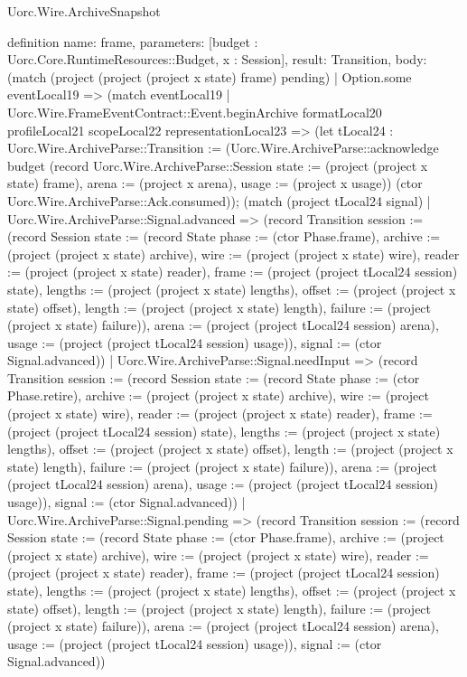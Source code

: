 \begin{lexlean}{Uorc.Wire.ArchiveSnapshot}
\begin{semanticmodule}
definition{
  name: frame,
  parameters: [budget : Uorc.Core.RuntimeResources::Budget, x : Session],
  result: Transition,
  body: (match (project (project (project x state) frame) pending)
    | Option.some eventLocal19 => (match eventLocal19
      | Uorc.Wire.FrameEventContract::Event.beginArchive formatLocal20 profileLocal21 scopeLocal22 representationLocal23 => (let tLocal24 : Uorc.Wire.ArchiveParse::Transition := (Uorc.Wire.ArchiveParse::acknowledge budget (record Uorc.Wire.ArchiveParse::Session {state := (project (project x state) frame), arena := (project x arena), usage := (project x usage)}) (ctor Uorc.Wire.ArchiveParse::Ack.consumed)); (match (project tLocal24 signal)
        | Uorc.Wire.ArchiveParse::Signal.advanced => (record Transition {session := (record Session {state := (record State {phase := (ctor Phase.frame), archive := (project (project x state) archive), wire := (project (project x state) wire), reader := (project (project x state) reader), frame := (project (project tLocal24 session) state), lengths := (project (project x state) lengths), offset := (project (project x state) offset), length := (project (project x state) length), failure := (project (project x state) failure)}), arena := (project (project tLocal24 session) arena), usage := (project (project tLocal24 session) usage)}), signal := (ctor Signal.advanced)})
        | Uorc.Wire.ArchiveParse::Signal.needInput => (record Transition {session := (record Session {state := (record State {phase := (ctor Phase.retire), archive := (project (project x state) archive), wire := (project (project x state) wire), reader := (project (project x state) reader), frame := (project (project tLocal24 session) state), lengths := (project (project x state) lengths), offset := (project (project x state) offset), length := (project (project x state) length), failure := (project (project x state) failure)}), arena := (project (project tLocal24 session) arena), usage := (project (project tLocal24 session) usage)}), signal := (ctor Signal.advanced)})
        | Uorc.Wire.ArchiveParse::Signal.pending => (record Transition {session := (record Session {state := (record State {phase := (ctor Phase.frame), archive := (project (project x state) archive), wire := (project (project x state) wire), reader := (project (project x state) reader), frame := (project (project tLocal24 session) state), lengths := (project (project x state) lengths), offset := (project (project x state) offset), length := (project (project x state) length), failure := (project (project x state) failure)}), arena := (project (project tLocal24 session) arena), usage := (project (project tLocal24 session) usage)}), signal := (ctor Signal.advanced)})
}
\end{semanticmodule}
\end{lexlean}
